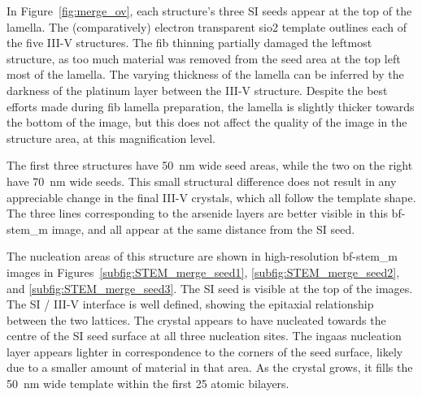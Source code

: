 In Figure~\ref{fig:merge_ov}, each structure's three \acl{SI} seeds appear at the top of the lamella. The (comparatively) electron transparent \acs{sio2} template outlines each of the five III-V structures. The \acs{fib} thinning partially damaged the leftmost structure, as too much material was removed from the seed area at the top left most of the lamella. The varying thickness of the lamella can be inferred by the darkness of the platinum layer between the III-V structure. Despite the best efforts made during \acs{fib} lamella preparation, the lamella is slightly thicker towards the bottom of the image, but this does not affect the quality of the image in the structure area, at this magnification level.

The first three structures have \qty{50}{\nano\metre} wide seed areas, while the two on the right have \qty{70}{\nano\metre} wide seeds. This small structural difference does not result in any appreciable change in the final III-V crystals, which all follow the template shape. The three lines corresponding to the arsenide layers are better visible in this \acs{bf}-\acs{stem_m} image, and all appear at the same distance from the \acl{SI} seed.

The nucleation areas of this structure are shown in high-resolution \acs{bf}-\acs{stem_m} images in Figures~\ref{subfig:STEM_merge_seed1}, \ref{subfig:STEM_merge_seed2}, and \ref{subfig:STEM_merge_seed3}. The \acl{SI} seed is visible at the top of the images. The \acs{SI} / III-V interface is well defined, showing the epitaxial relationship between the two lattices. The crystal appears to have nucleated towards the centre of the \acl{SI} seed surface at all three nucleation sites. The \acs{ingaas} nucleation layer appears lighter in correspondence to the corners of the seed surface, likely due to a smaller amount of material in that area. As the crystal grows, it fills the \qty{50}{\nano\metre} wide template within the first 25 atomic bilayers.

